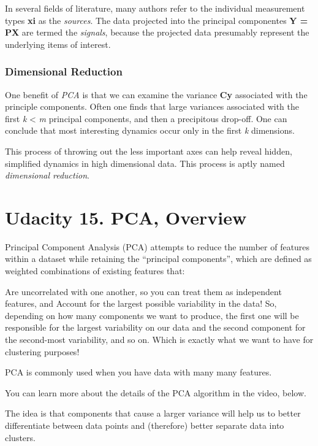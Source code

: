 In several fields of literature, many authors refer to the individual
measurement types \textbf{xi} as the \emph{sources}. The data projected
into the principal componentes \textbf{Y = PX} are termed the
\emph{signals}, because the projected data presumably represent the
underlying items of interest.

\hypertarget{dimensional-reduction}{%
\subsubsection{Dimensional Reduction}\label{dimensional-reduction}}

One benefit of \emph{PCA} is that we can examine the variance
\textbf{Cy} associated with the principle components. Often one finds
that large variances associated with the first \emph{k} \textless{}
\emph{m} principal components, and then a precipitous drop-off. One can
conclude that most interesting dynamics occur only in the first \emph{k}
dimensions.

This process of throwing out the less important axes can help reveal
hidden, simplified dynamics in high dimensional data. This process is
aptly named \emph{dimensional reduction}.

\hypertarget{udacity-15.-pca-overview}{%
\section{Udacity 15. PCA, Overview}\label{udacity-15.-pca-overview}}

Principal Component Analysis (PCA) attempts to reduce the number of
features within a dataset while retaining the ``principal components'',
which are defined as weighted combinations of existing features that:

Are uncorrelated with one another, so you can treat them as independent
features, and Account for the largest possible variability in the data!
So, depending on how many components we want to produce, the first one
will be responsible for the largest variability on our data and the
second component for the second-most variability, and so on. Which is
exactly what we want to have for clustering purposes!

PCA is commonly used when you have data with many many features.

You can learn more about the details of the PCA algorithm in the video,
below.

The idea is that components that cause a larger variance will help us to
better differentiate between data points and (therefore) better separate
data into clusters.

